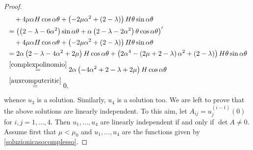 \documentclass[11pt]{amsart}
\theoremstyle{definition}
\theoremstyle{remark}
\numberwithin{equation}{section}
\begin{document}
\begin{proof}
\begin{equation*}
\begin{split}
	&\quad+4\mu\alpha H\cos\alpha\theta+\left(-2\mu\alpha^2 +(2-\lambda)\right)H\theta\sin\alpha\theta\\
	&=\left(\left(2-\lambda-6\alpha^2\right)\sin\alpha\theta+\alpha\left(2-\lambda-2\alpha^2\right)\theta\cos\alpha\theta\right)'\\
	&\quad+4\mu\alpha H\cos\alpha\theta+\left(-2\mu\alpha^2 +(2-\lambda)\right)H\theta\sin\alpha\theta\\
	&=2\alpha\left(2-\lambda-4\alpha^2+2\mu\right)H\cos\alpha\theta+\left(2\alpha^4-\left(2\mu+2-\lambda\right)\alpha^2+(2-\lambda)\right)H\theta\sin\alpha\theta\\
	&\overset{\eqref{complexpolinomio}}{=}2\alpha\left(-4\alpha^2+2-\lambda+2\mu\right)H\cos\alpha\theta\\
	&\overset{\eqref{auxcomputcritic}}{=}0,
\end{split}
\end{equation*}
whence $u_3$ is a solution. Similarly,  $u_4$ is a solution too.     
We are left to prove that the above solutions are linearly independent. To this aim, let $A_{ij}=u^{(i-1)}_j(0)$ for $i,j=1,\ldots,4$. Then $u_1,\ldots,u_4$ are linearly independent if and only if $\det A\neq 0$. 
Assume first that $\mu<\mu_0$ and $u_1,\ldots,u_4$ are the functions given by \eqref{soluzionicasocomplesso}.

\end{proof}
\end{document}

